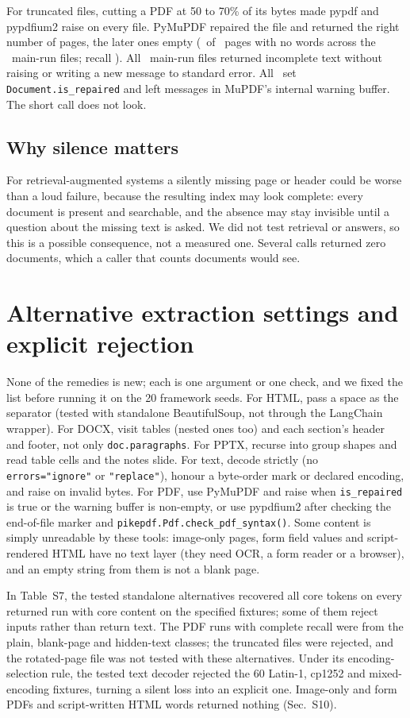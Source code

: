 \documentclass[aps,pre,twocolumn,superscriptaddress,nofootinbib,10pt]{revtex4-2}
\begin{document}
For truncated files, cutting a PDF at 50 to 70\% of its bytes made pypdf and pypdfium2 raise on every file. PyMuPDF repaired the file and returned the right number of pages, the later ones empty (\pZeroPages\ of \pPages\ pages with no words across the \pFiles\ main-run files; recall \muTruncMain). All \pFiles\ main-run files returned incomplete text without raising or writing a new message to standard error. All \pRepaired\ set \texttt{Document.is\_repaired} and left messages in MuPDF's internal warning buffer. The short call does not look.

\subsection{Why silence matters}
For retrieval-augmented systems a silently missing page or header could be worse than a loud failure, because the resulting index may look complete: every document is present and searchable, and the absence may stay invisible until a question about the missing text is asked. We did not test retrieval or answers, so this is a possible consequence, not a measured one. Several calls returned zero documents, which a caller that counts documents would see.

\section{Alternative extraction settings and explicit rejection}
None of the remedies is new; each is one argument or one check, and we fixed the list before running it on the 20 framework seeds. For HTML, pass a space as the separator (tested with standalone BeautifulSoup, not through the LangChain wrapper). For DOCX, visit tables (nested ones too) and each section's header and footer, not only \texttt{doc.paragraphs}. For PPTX, recurse into group shapes and read table cells and the notes slide. For text, decode strictly (no \texttt{errors="ignore"} or \texttt{"replace"}), honour a byte-order mark or declared encoding, and raise on invalid bytes. For PDF, use PyMuPDF and raise when \texttt{is\_repaired} is true or the warning buffer is non-empty, or use pypdfium2 after checking the end-of-file marker and \texttt{pikepdf.Pdf.check\_pdf\_syntax()}. Some content is simply unreadable by these tools: image-only pages, form field values and script-rendered HTML have no text layer (they need OCR, a form reader or a browser), and an empty string from them is not a blank page.

In Table~S7, the tested standalone alternatives recovered all core tokens on every returned run with core content on the specified fixtures; some of them reject inputs rather than return text. The PDF runs with complete recall were from the plain, blank-page and hidden-text classes; the truncated files were rejected, and the rotated-page file was not tested with these alternatives. Under its encoding-selection rule, the tested text decoder rejected the 60 Latin-1, cp1252 and mixed-encoding fixtures, turning a silent loss into an explicit one. Image-only and form PDFs and script-written HTML words returned nothing (Sec.~S10).
\end{document}
